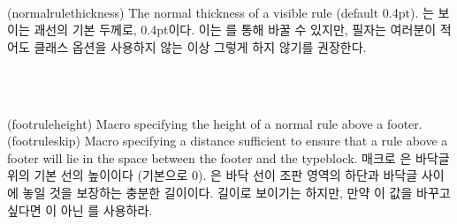 \begin{syntax}
\lnc{\normalrulethickness} \\
\end{syntax}
\glossary(normalrulethickness)%
  {}%
  {The normal thickness of a visible rule (default 0.4pt).}
\lnc{\normalrulethickness}는 보이는 괘선의 기본
두께로, 0.4pt이다.
이는 \cmd{\setlength}를 통해 바꿀 수 있지만, 필자는 여러분이 적어도 \Lopt{14pt}
클래스 옵션을 사용하지 않는 이상 그렇게 하지 않기를 권장한다.

\begin{syntax}
\cmd{\footruleheight} \\
\cmd{\footruleskip} \\
\end{syntax}
\glossary(footruleheight)%
  {}%
  {Macro specifying the height of a normal rule above a footer.}
\glossary(footruleskip)%
  {}%
  {Macro specifying a distance sufficient to ensure that a rule above a footer
   will lie in the space between the footer and the typeblock.}
매크로 \cmd{\footruleheight}은 바닥글 위의 기본 선의
높이이다 (기본으로 0).
\cmd{\footruleskip}은 바닥 선이 조판 영역의 하단과
바닥글 사이에 놓일 것을 보장하는 충분한 길이이다.
길이로 보이기는 하지만, 만약 이 값을 바꾸고 싶다면 \cmd{\setlength}이 아닌
\cmd{\renewcommand}를 사용하라.

